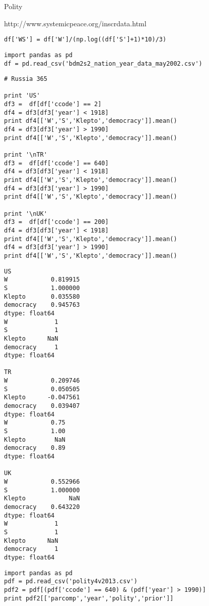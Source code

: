 \documentclass[12pt,fleqn]{article}\usepackage{common}
\begin{document}
Polity

http://www.systemicpeace.org/inscrdata.html

\begin{verbatim}
df['WS'] = df['W']/(np.log((df['S']+1)*10)/3)
\end{verbatim}


\begin{verbatim}
import pandas as pd
df = pd.read_csv('bdm2s2_nation_year_data_may2002.csv')
\end{verbatim}


\begin{verbatim}
# Russia 365

print 'US'
df3 =  df[df['ccode'] == 2]
df4 = df3[df3['year'] < 1918]
print df4[['W','S','Klepto','democracy']].mean()
df4 = df3[df3['year'] > 1990]
print df4[['W','S','Klepto','democracy']].mean()

print '\nTR'
df3 =  df[df['ccode'] == 640]
df4 = df3[df3['year'] < 1918]
print df4[['W','S','Klepto','democracy']].mean()
df4 = df3[df3['year'] > 1990]
print df4[['W','S','Klepto','democracy']].mean()

print '\nUK'
df3 =  df[df['ccode'] == 200]
df4 = df3[df3['year'] < 1918]
print df4[['W','S','Klepto','democracy']].mean()
df4 = df3[df3['year'] > 1990]
print df4[['W','S','Klepto','democracy']].mean()
\end{verbatim}

\begin{verbatim}
US
W            0.819915
S            1.000000
Klepto       0.035580
democracy    0.945763
dtype: float64
W             1
S             1
Klepto      NaN
democracy     1
dtype: float64

TR
W            0.209746
S            0.050505
Klepto      -0.047561
democracy    0.039407
dtype: float64
W            0.75
S            1.00
Klepto        NaN
democracy    0.89
dtype: float64

UK
W            0.552966
S            1.000000
Klepto            NaN
democracy    0.643220
dtype: float64
W             1
S             1
Klepto      NaN
democracy     1
dtype: float64
\end{verbatim}

\begin{verbatim}
import pandas as pd
pdf = pd.read_csv('polity4v2013.csv')
pdf2 = pdf[(pdf['ccode'] == 640) & (pdf['year'] > 1990)]
print pdf2[['parcomp','year','polity','prior']]
\end{verbatim}
\end{document}
